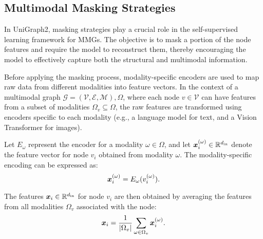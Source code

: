 \subsection{Multimodal Masking Strategies}
In UniGraph2, masking strategies play a crucial role in the self-supervised learning framework for MMGs. The objective is to mask a portion of the node features and require the model to reconstruct them, thereby encouraging the model to effectively capture both the structural and multimodal information.

Before applying the masking process, modality-specific encoders are used to map raw data from different modalities into feature vectors. In the context of a multimodal graph \( \mathcal{G} = (\mathcal{V}, \mathcal{E}, \mathcal{M}), \Omega\), where each node \( v \in \mathcal{V} \) can have features from a subset of modalities \( \Omega_v \subseteq \Omega \), the raw features are transformed using encoders specific to each modality (e.g., a language model for text, and a Vision Transformer for images).

Let \( E_{\omega} \) represent the encoder for a modality \( \omega \in \Omega \), and let \( {\bm{x}}_i^{(\omega)} \in \mathbb{R}^{d_{\text{in}}} \) denote the feature vector for node \( v_i \) obtained from modality \( \omega \). The modality-specific encoding can be expressed as:
\begin{equation}
    {\bm{x}}_i^{(\omega)} = E_{\omega}(v_i^{(\omega)}).
\end{equation}

The features \( {\bm{x}}_i \in \mathbb{R}^{d_{\text{in}}} \) for node \( v_i \) are then obtained by averaging the features from all modalities \( \Omega_v \) associated with the node:
\begin{equation}
    {\bm{x}}_i = \frac{1}{|\Omega_v|} \sum_{\omega \in \Omega_v} {\bm{x}}_i^{(\omega)}.
\end{equation}


